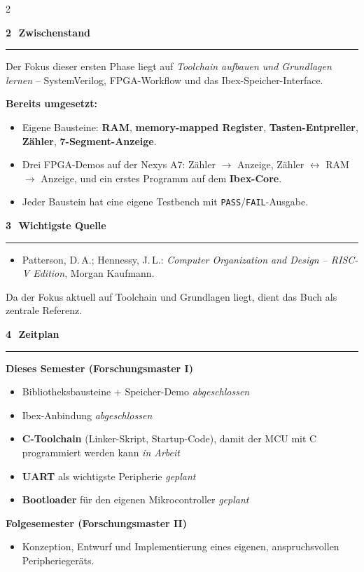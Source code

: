 \documentclass[25pt]{extarticle}
\newcommand{\posterheading}[1]{%
  \par\vspace{8mm}%
  {\fontsize{44}{52}\selectfont\bfseries #1}%
  \par\vspace{3mm}%
  {\color{accentcolor}\rule{\linewidth}{1.5mm}}%
  \par\vspace{4mm}%
}
\newcommand{\subheading}[1]{%
  \par\vspace{3mm}%
  {\fontsize{32}{38}\selectfont\bfseries #1}\par\vspace{1mm}%
}
\begin{document}
\begin{multicols}{2}

\posterheading{2\,~Zwischenstand}

Der Fokus dieser ersten Phase liegt auf \emph{Toolchain aufbauen und
Grundlagen lernen} -- SystemVerilog, FPGA-Workflow und das
Ibex-Speicher-Interface.

\smallskip
\textbf{Bereits umgesetzt:}
\begin{itemize}
  \item Eigene Bausteine: \textbf{RAM}, \textbf{memory-mapped Register},
        \textbf{Tasten-Entpreller}, \textbf{Z\"ahler},
        \textbf{7-Segment-Anzeige}.
  \item Drei FPGA-Demos auf der Nexys A7: Z\"ahler $\rightarrow$ Anzeige,
        Z\"ahler $\leftrightarrow$ RAM $\rightarrow$ Anzeige, und ein
        erstes Programm auf dem \textbf{Ibex-Core}.
  \item Jeder Baustein hat eine eigene Testbench mit
        \texttt{PASS}/\texttt{FAIL}-Ausgabe.
\end{itemize}

\posterheading{3\,~Wichtigste Quelle}

\begin{itemize}
  \item Patterson, D.\,A.; Hennessy, J.\,L.: \emph{Computer Organization
        and Design -- RISC-V Edition}, Morgan Kaufmann.
\end{itemize}

\smallskip
Da der Fokus aktuell auf Toolchain und Grundlagen liegt, dient das
Buch als zentrale Referenz.

\columnbreak

\posterheading{4\,~Zeitplan}

\subheading{Dieses Semester (Forschungsmaster I)}
\begin{itemize}
  \item Bibliotheksbausteine + Speicher-Demo \hfill \emph{abgeschlossen}
  \item Ibex-Anbindung \hfill \emph{abgeschlossen}
  \item \textbf{C-Toolchain} (Linker-Skript, Startup-Code), damit der
        MCU mit C programmiert werden kann \hfill \emph{in Arbeit}
  \item \textbf{UART} als wichtigste Peripherie \hfill \emph{geplant}
  \item \textbf{Bootloader} f\"ur den eigenen Mikrocontroller
        \hfill \emph{geplant}
\end{itemize}

\subheading{Folgesemester (Forschungsmaster II)}
\begin{itemize}
  \item Konzeption, Entwurf und Implementierung eines eigenen,
        anspruchsvollen Peripherieger\"ats.
\end{itemize}

\end{multicols}
\end{document}

